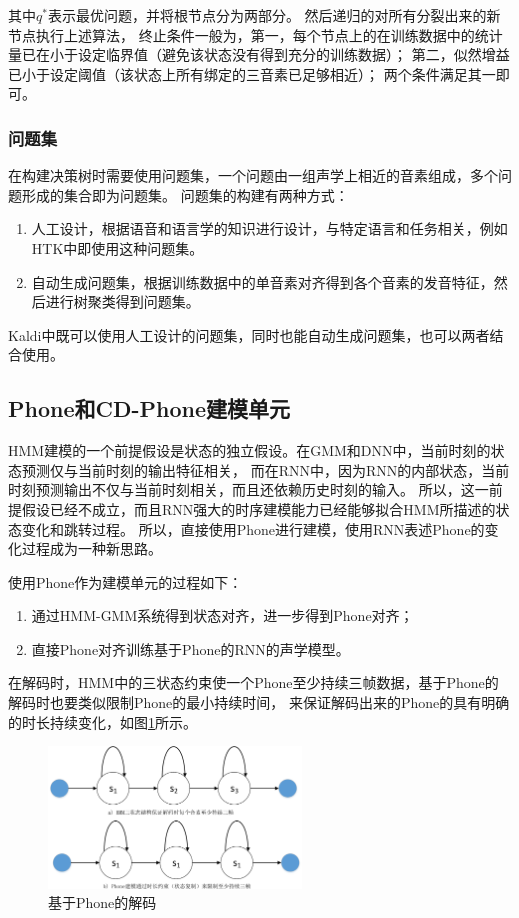 其中$q^*$表示最优问题，并将根节点分为两部分。
然后递归的对所有分裂出来的新节点执行上述算法，
终止条件一般为，第一，每个节点上的在训练数据中的统计量已在小于设定临界值（避免该状态没有得到充分的训练数据）；
第二，似然增益已小于设定阈值（该状态上所有绑定的三音素已足够相近）； 两个条件满足其一即可。

\subsubsection{问题集}

在构建决策树时需要使用问题集，一个问题由一组声学上相近的音素组成，多个问题形成的集合即为问题集。
问题集的构建有两种方式：
\begin{enumerate}
\item 人工设计，根据语音和语言学的知识进行设计，与特定语言和任务相关，例如HTK中即使用这种问题集。
\item 自动生成问题集，根据训练数据中的单音素对齐得到各个音素的发音特征，然后进行树聚类得到问题集。
\end{enumerate}
Kaldi中既可以使用人工设计的问题集，同时也能自动生成问题集，也可以两者结合使用。

\subsection{Phone和CD-Phone建模单元}

HMM建模的一个前提假设是状态的独立假设。在GMM和DNN中，当前时刻的状态预测仅与当前时刻的输出特征相关，
而在RNN中，因为RNN的内部状态，当前时刻预测输出不仅与当前时刻相关，而且还依赖历史时刻的输入。
所以，这一前提假设已经不成立，而且RNN强大的时序建模能力已经能够拟合HMM所描述的状态变化和跳转过程。
所以，直接使用Phone进行建模，使用RNN表述Phone的变化过程成为一种新思路。

使用Phone作为建模单元的过程如下：
\begin{enumerate}
\item 通过HMM-GMM系统得到状态对齐，进一步得到Phone对齐；
\item 直接Phone对齐训练基于Phone的RNN的声学模型。
\end{enumerate}
在解码时，HMM中的三状态约束使一个Phone至少持续三帧数据，基于Phone的解码时也要类似限制Phone的最小持续时间，
来保证解码出来的Phone的具有明确的时长持续变化，如图\ref{fig:duration}所示。

\begin{figure}[htbp]
\centering
\includegraphics[width=0.6\textwidth]{figures/chapter4/duration-crop}
\caption{基于Phone的解码}
\label{fig:duration}
\end{figure}

